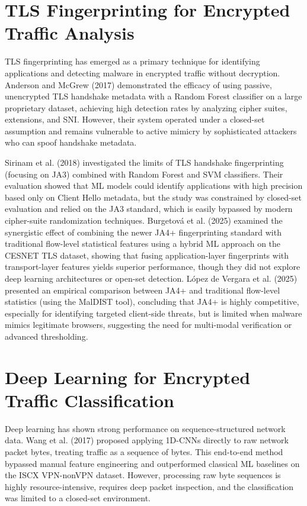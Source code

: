 \documentclass[12pt,a4paper]{report}
\begin{document}
\section{TLS Fingerprinting for Encrypted Traffic Analysis}

TLS fingerprinting has emerged as a primary technique for identifying applications and detecting malware in encrypted traffic without decryption. Anderson and McGrew (2017) demonstrated the efficacy of using passive, unencrypted TLS handshake metadata with a Random Forest classifier on a large proprietary dataset, achieving high detection rates by analyzing cipher suites, extensions, and SNI. However, their system operated under a closed-set assumption and remains vulnerable to active mimicry by sophisticated attackers who can spoof handshake metadata.

Sirinam et al. (2018) investigated the limits of TLS handshake fingerprinting (focusing on JA3) combined with Random Forest and SVM classifiers. Their evaluation showed that ML models could identify applications with high precision based only on Client Hello metadata, but the study was constrained by closed-set evaluation and relied on the JA3 standard, which is easily bypassed by modern cipher-suite randomization techniques. Burgetov\'{a} et al. (2025) examined the synergistic effect of combining the newer JA4+ fingerprinting standard with traditional flow-level statistical features using a hybrid ML approach on the CESNET TLS dataset, showing that fusing application-layer fingerprints with transport-layer features yields superior performance, though they did not explore deep learning architectures or open-set detection. L\'{o}pez de Vergara et al. (2025) presented an empirical comparison between JA4+ and traditional flow-level statistics (using the MalDIST tool), concluding that JA4+ is highly competitive, especially for identifying targeted client-side threats, but is limited when malware mimics legitimate browsers, suggesting the need for multi-modal verification or advanced thresholding.

\section{Deep Learning for Encrypted Traffic Classification}

Deep learning has shown strong performance on sequence-structured network data. Wang et al. (2017) proposed applying 1D-CNNs directly to raw network packet bytes, treating traffic as a sequence of bytes. This end-to-end method bypassed manual feature engineering and outperformed classical ML baselines on the ISCX VPN-nonVPN dataset. However, processing raw byte sequences is highly resource-intensive, requires deep packet inspection, and the classification was limited to a closed-set environment.
\end{document}

